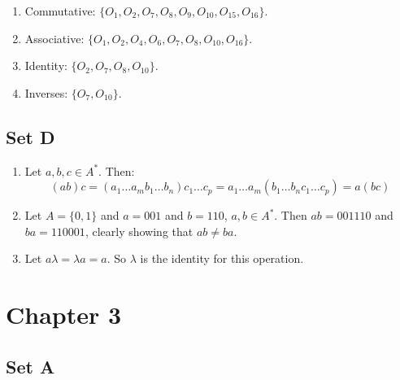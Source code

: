 \documentclass{article}
\begin{document}
\begin{enumerate}
    \item Commutative: $\{O_1, O_2, O_7, O_8, O_9, O_{10}, O_{15}, O_{16}\}$.
    \item Associative: $\{O_1, O_2, O_4, O_6, O_7, O_8, O_{10}, O_{16}\}$.
    \item Identity: $\{O_2, O_7, O_8, O_{10}\}$.
    \item Inverses: $\{O_7, O_{10}\}$.
\end{enumerate}

\subsection{Set D}
\begin{enumerate}
    \item Let $a, b, c \in A^*$. Then:
        $$(ab)c = (a_1\ldots a_mb_1\ldots b_n)c_1\ldots c_p = a_1\ldots a_m(b_1\ldots b_nc_1\ldots c_p) = a(bc)$$
    \item Let $A = \{0, 1\}$ and $a = 001$ and $b = 110$, $a, b \in A^*$. Then $ab = 001110$ and $ba = 110001$, clearly showing that $ab \ne ba$.
    \item Let $a\lambda = \lambda a = a$. So $\lambda$ is the identity for this operation.
\end{enumerate}

\section{Chapter 3}

\subsection{Set A}
\end{document}
